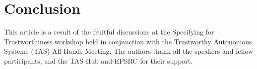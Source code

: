 \documentclass[sigconf]{acmart}
\begin{document}
%






\section{Conclusion}

\begin{acks}
This article is a result of the fruitful discussions at the Specifying for Trustworthiness workshop held in conjunction with the Trustworthy Autonomous Systems (TAS) All Hands Meeting. The authors thank all the speakers and fellow participants, and the TAS Hub and EPSRC for their support.
\end{acks}



\end{document}
